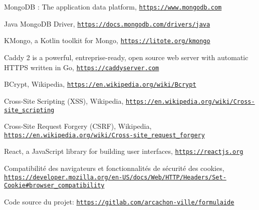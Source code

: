 \documentclass[11pt,french]{memoir}
\newcommand{\hrefs}[1]{\href{#1}{\texttt{#1}}}
\begin{document}
	\appendix
	\renewcommand{\bibname}{Références}
	\begin{thebibliography}{9}

		MongoDB : The application data platform,
		\hrefs{https://www.mongodb.com}

		Java MongoDB Driver,
		\hrefs{https://docs.mongodb.com/drivers/java}

		KMongo, a Kotlin toolkit for Mongo,
		\hrefs{https://litote.org/kmongo}

		Caddy 2 is a powerful, entreprise-ready, open source web server with automatic HTTPS written in Go,
		\hrefs{https://caddyserver.com}

		BCrypt, Wikipedia,
		\hrefs{https://en.wikipedia.org/wiki/Bcrypt}

		Cross-Site Scripting (XSS), Wikipedia,
		\hrefs{https://en.wikipedia.org/wiki/Cross-site\_scripting}

		Cross-Site Request Forgery (CSRF), Wikipedia,
		\hrefs{https://en.wikipedia.org/wiki/Cross-site\_request\_forgery}

		React, a JavaScript library for building user interfaces,
		\hrefs{https://reactjs.org}

		Compatibilité des navigateurs et fonctionnalités de sécurité des cookies,
		\hrefs{https://developer.mozilla.org/en-US/docs/Web/HTTP/Headers/Set-Cookie\#browser\_compatibility}

		Code source du projet:
		\hrefs{https://gitlab.com/arcachon-ville/formulaide}

	\end{thebibliography}
\end{document}
